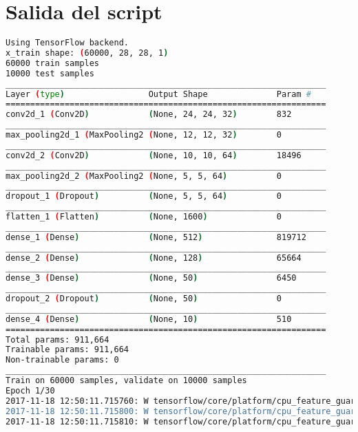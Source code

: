 \section{Salida del script}
\begin{lstlisting}[language=bash]
Using TensorFlow backend.
x_train shape: (60000, 28, 28, 1)
60000 train samples
10000 test samples
_________________________________________________________________
Layer (type)                 Output Shape              Param #
=================================================================
conv2d_1 (Conv2D)            (None, 24, 24, 32)        832
_________________________________________________________________
max_pooling2d_1 (MaxPooling2 (None, 12, 12, 32)        0
_________________________________________________________________
conv2d_2 (Conv2D)            (None, 10, 10, 64)        18496
_________________________________________________________________
max_pooling2d_2 (MaxPooling2 (None, 5, 5, 64)          0
_________________________________________________________________
dropout_1 (Dropout)          (None, 5, 5, 64)          0
_________________________________________________________________
flatten_1 (Flatten)          (None, 1600)              0
_________________________________________________________________
dense_1 (Dense)              (None, 512)               819712
_________________________________________________________________
dense_2 (Dense)              (None, 128)               65664
_________________________________________________________________
dense_3 (Dense)              (None, 50)                6450
_________________________________________________________________
dropout_2 (Dropout)          (None, 50)                0
_________________________________________________________________
dense_4 (Dense)              (None, 10)                510
=================================================================
Total params: 911,664
Trainable params: 911,664
Non-trainable params: 0
_________________________________________________________________
Train on 60000 samples, validate on 10000 samples
Epoch 1/30
2017-11-18 12:50:11.715760: W tensorflow/core/platform/cpu_feature_guard.cc:45] The TensorFlow library wasn't compiled to use SSE4.1 instructions, but these are available on your machine and could speed up CPU computations.
2017-11-18 12:50:11.715800: W tensorflow/core/platform/cpu_feature_guard.cc:45] The TensorFlow library wasn't compiled to use SSE4.2 instructions, but these are available on your machine and could speed up CPU computations.
2017-11-18 12:50:11.715810: W tensorflow/core/platform/cpu_feature_guard.cc:45] The TensorFlow library wasn't compiled to use AVX instructions, but these are available on your machine and could speed up CPU computations.

\end{lstlisting}
